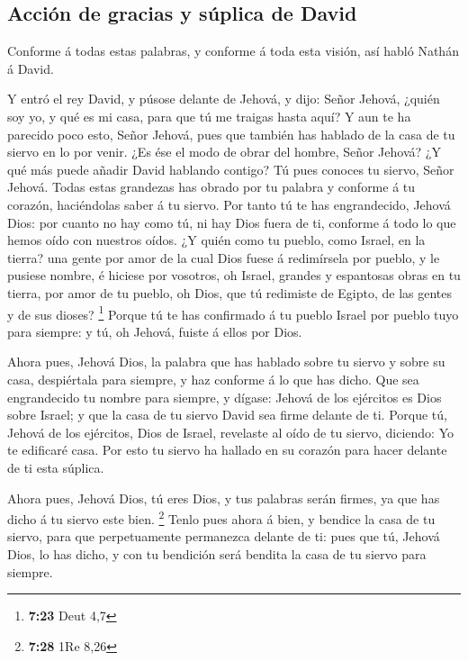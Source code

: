 \hypertarget{acciuxf3n-de-gracias-y-suxfaplica-de-david}{%
\subsection{Acción de gracias y súplica de
David}\label{acciuxf3n-de-gracias-y-suxfaplica-de-david}}

 Conforme á todas estas palabras, y conforme á toda esta
visión, así habló Nathán á David.

 Y entró el rey David, y púsose delante de Jehová, y
dijo: Señor Jehová, ¿quién soy yo, y qué es mi casa, para que tú me
traigas hasta aquí?  Y aun te ha parecido poco esto,
Señor Jehová, pues que también has hablado de la casa de tu siervo en lo
por venir. ¿Es ése el modo de obrar del hombre, Señor Jehová?
 ¿Y qué más puede añadir David hablando contigo? Tú pues
conoces tu siervo, Señor Jehová.  Todas estas grandezas
has obrado por tu palabra y conforme á tu corazón, haciéndolas saber á
tu siervo.  Por tanto tú te has engrandecido, Jehová
Dios: por cuanto no hay como tú, ni hay Dios fuera de ti, conforme á
todo lo que hemos oído con nuestros oídos.  ¿Y quién como
tu pueblo, como Israel, en la tierra? una gente por amor de la cual Dios
fuese á redimírsela por pueblo, y le pusiese nombre, é hiciese por
vosotros, oh Israel, grandes y espantosas obras en tu tierra, por amor
de tu pueblo, oh Dios, que tú redimiste de Egipto, de las gentes y de
sus dioses? \footnote{\textbf{7:23} Deut 4,7}  Porque tú
te has confirmado á tu pueblo Israel por pueblo tuyo para siempre: y tú,
oh Jehová, fuiste á ellos por Dios.

 Ahora pues, Jehová Dios, la palabra que has hablado
sobre tu siervo y sobre su casa, despiértala para siempre, y haz
conforme á lo que has dicho.  Que sea engrandecido tu
nombre para siempre, y dígase: Jehová de los ejércitos es Dios sobre
Israel; y que la casa de tu siervo David sea firme delante de ti.
 Porque tú, Jehová de los ejércitos, Dios de Israel,
revelaste al oído de tu siervo, diciendo: Yo te edificaré casa. Por esto
tu siervo ha hallado en su corazón para hacer delante de ti esta
súplica.

 Ahora pues, Jehová Dios, tú eres Dios, y tus palabras
serán firmes, ya que has dicho á tu siervo este bien. \footnote{\textbf{7:28}
  1Re 8,26}  Tenlo pues ahora á bien, y bendice la casa
de tu siervo, para que perpetuamente permanezca delante de ti: pues que
tú, Jehová Dios, lo has dicho, y con tu bendición será bendita la casa
de tu siervo para siempre.

